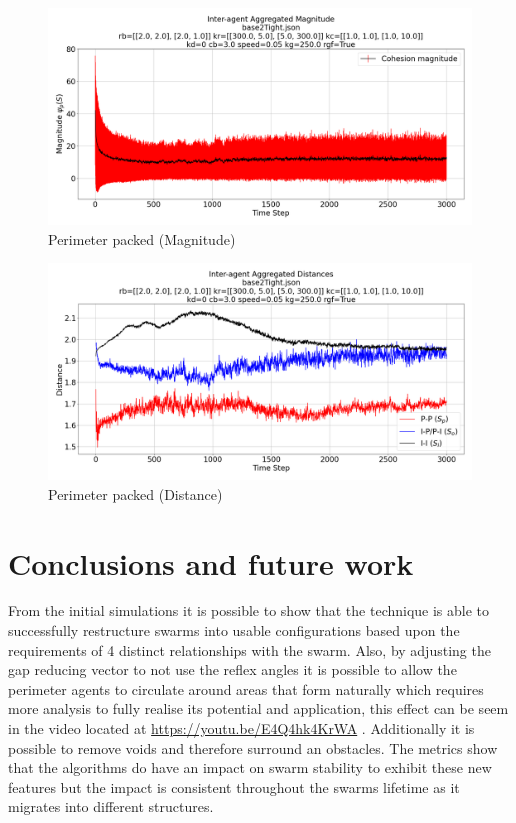 \documentclass[12pt,a4paper]{IEEEtran}
\begin{document}
\begin{figure}[H]
	\begin{center}
		\includegraphics[width=1.0\linewidth]{figures/baseline2PackedMagnitude}
	\end{center}
	\caption{Perimeter packed (Magnitude)\label{fig:baseline2PackedMagnitude}}
\end{figure}

\begin{figure}[H]
	\begin{center}
		\includegraphics[width=1.0\linewidth]{figures/baseline2PackedDistance}
	\end{center}
	\caption{Perimeter packed (Distance)\label{fig:baseline2PackedDistance}}
\end{figure}

\section{Conclusions and future work}\label{conclusions}
From the initial simulations it is possible to show that the technique is able to successfully restructure swarms into usable configurations based upon the requirements of 4 distinct relationships with the swarm. Also, by adjusting the gap reducing vector to not use the reflex angles it is possible to allow the perimeter agents to circulate around areas that form naturally which requires more analysis to fully realise its potential and application, this effect can be seem in the video located at \url{https://youtu.be/E4Q4hk4KrWA} . Additionally it is possible to remove voids and therefore surround an obstacles. The metrics show that the algorithms do have an impact on swarm stability to exhibit these new features but the impact is consistent throughout the swarms lifetime as it migrates into different structures.
\end{document}
